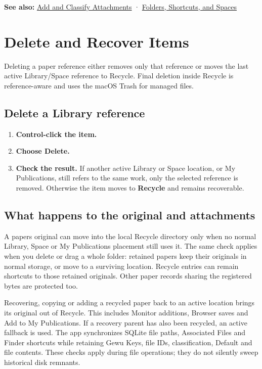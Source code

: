 \documentclass[10pt,letterpaper,oneside]{scrreprt}
\providecommand{\tightlist}{\setlength{\itemsep}{1pt}\setlength{\parskip}{0pt}}
\newenvironment{GewuRelated}{\par\nobreak\vspace{3pt}\nobreak\begingroup\small\sffamily\begin{samepage}\noindent}{\par\end{samepage}\endgroup}
\newenvironment{GewuLead}
  {\begin{list}{}{\leftmargin=0pt\rightmargin=0pt\topsep=0pt\partopsep=0pt\parsep=0pt}\item\relax
    \sffamily\fontsize{10.5}{13.2}\selectfont\color{GewuMuted}}
  {\end{list}}
\begin{document}
\begin{GewuRelated}
\textbf{See also:} \hyperref[attachments]{Add and Classify Attachments} · \hyperref[organize]{Folders, Shortcuts, and Spaces}
\end{GewuRelated}

\section{Delete and Recover Items}\label{recycle}

\begin{GewuLead}
Deleting a paper reference either removes only that reference or moves the last active Library/Space reference to Recycle. Final deletion inside Recycle is reference-aware and uses the macOS Trash for managed files.
\end{GewuLead}

\subsection{Delete a Library reference}\label{delete-a-library-reference}

\begin{enumerate}
\tightlist
\item
  \textbf{Control-click the item.}
\item
  \textbf{Choose \textbf{Delete}.}
\item
  \textbf{Check the result.} If another active Library or Space location, or My Publications, still refers to the same work, only the selected reference is removed. Otherwise the item moves to \textbf{Recycle} and remains recoverable.
\end{enumerate}

\subsection{What happens to the original and attachments}\label{what-happens-to-the-original-and-attachments}

A paper\textquotesingle s original can move into the local Recycle directory only when no normal Library, Space or My Publications placement still uses it. The same check applies when you delete or drag a whole folder: retained papers keep their originals in normal storage, or move to a surviving location. Recycle entries can remain shortcuts to those retained originals. Other paper records sharing the registered bytes are protected too.

Recovering, copying or adding a recycled paper back to an active location brings its original out of Recycle. This includes Monitor additions, Browser saves and Add to My Publications. If a recovery parent has also been recycled, an active fallback is used. The app synchronizes SQLite file paths, Associated Files and Finder shortcuts while retaining Gewu Keys, file IDs, classification, Default and file contents. These checks apply during file operations; they do not silently sweep historical disk remnants.
\end{document}
